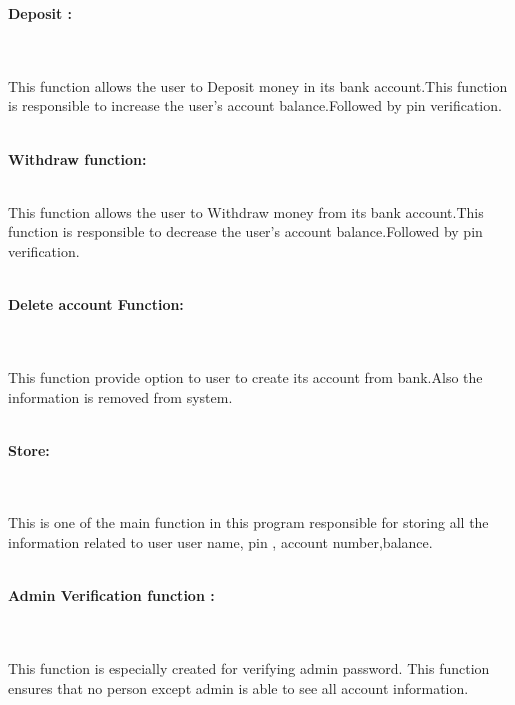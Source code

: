 \documentclass[11pt, a4paper]{article}
\begin{document}
\begin{left}
    \textbf{\Large{Deposit :}}
\end{left}
\\
\large{\\This function allows the user to Deposit money in its bank account.This function is responsible to increase the user's account balance.Followed by pin verification.}
\\
\\
\begin{left}
    \textbf{\Large{Withdraw function:}}
\end{left}


\large{\\This function allows the user to Withdraw money from its bank account.This function is responsible to decrease the user's account balance.Followed by pin verification.}
\\\\
\begin{left}
    \textbf{\Large{Delete account Function:}}
\end{left}
\\\\
\large{This function provide option to user to create its account from bank.Also the information is removed from system.}
\\\\
\begin{left}
    \textbf{\Large{Store:}}
\end{left}
\large{\\\\This is one of the main function in this program responsible for storing all the information related to user user name, pin , account number,balance. }
\\\\
\begin{left}
    \textbf{\Large{Admin Verification function :}}
\end{left}
\\\\
\large{This function is especially created for verifying admin password. This function ensures that no person except admin is able to see all account information.}
\end{document}
